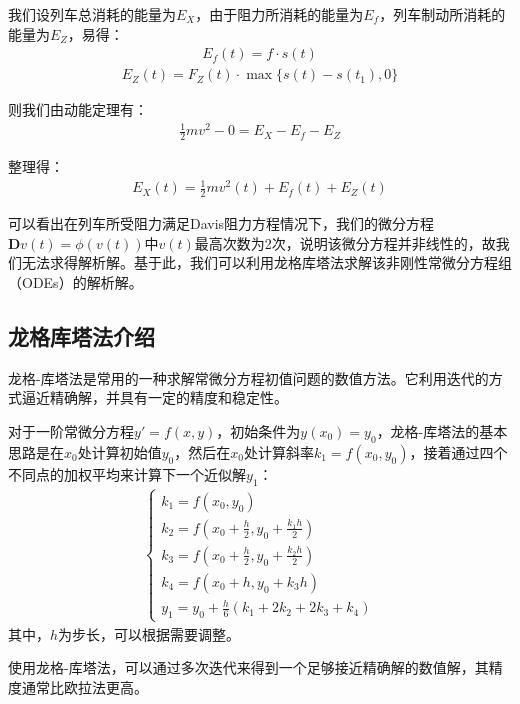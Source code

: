 \documentclass[12pt,a4paper]{nmmcm}
\begin{document}
我们设列车总消耗的能量为$E_X$，由于阻力所消耗的能量为$E_f$，列车制动所消耗的能量为$E_Z$，易得：
\begin{eqnarray}
E_f(t)=f\cdot s(t)
\end{eqnarray}
\begin{eqnarray}
E_Z(t)=F_Z(t)\cdot \max\{s(t)-s(t_1),0\}
\end{eqnarray}

则我们由动能定理有：
\begin{eqnarray}
\frac{1}{2}mv^2-0=E_X-E_f-E_Z
\end{eqnarray}

整理得：
\begin{eqnarray}
E_X(t)=\frac{1}{2}mv^2(t)+E_f(t)+E_Z(t)
\end{eqnarray}

可以看出在列车所受阻力满足Davis阻力方程情况下，我们的微分方程$\mathbf{D}{v(t)}=\phi (v(t))$中$v(t)$最高次数为2次，说明该微分方程并非线性的，故我们无法求得解析解。基于此，我们可以利用龙格库塔法求解该非刚性常微分方程组（ODEs）的解析解。
\subsection{龙格库塔法介绍}
龙格-库塔法是常用的一种求解常微分方程初值问题的数值方法。它利用迭代的方式逼近精确解，并具有一定的精度和稳定性。

对于一阶常微分方程$y'=f(x,y)$，初始条件为$y(x_0)=y_0$，龙格-库塔法的基本思路是在$x_0$处计算初始值$y_0$，然后在$x_0$处计算斜率$k_1=f(x_0,y_0)$，接着通过四个不同点的加权平均来计算下一个近似解$y_1$：
\begin{eqnarray}
\left\{\begin{matrix}
k_1=f(x_0,y_0) \\
k_2=f(x_0+\frac{h}{2},y_0+\frac{k_1h}{2}) \\
k_3=f(x_0+\frac{h}{2},y_0+\frac{k_2h}{2}) \\
k_4=f(x_0+h,y_0+k_3h) \\
y_1=y_0+\frac{h}{6}(k_1+2k_2+2k_3+k_4)
\end{matrix}\right.
\end{eqnarray}
其中，$h$为步长，可以根据需要调整。

使用龙格-库塔法，可以通过多次迭代来得到一个足够接近精确解的数值解，其精度通常比欧拉法更高。
\end{document}
